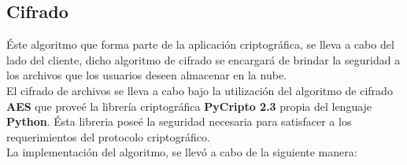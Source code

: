 \subsection{Cifrado}
Éste algoritmo que forma parte de la aplicación criptográfica, se lleva a cabo del lado del cliente, dicho algoritmo de cifrado se encargará de brindar la seguridad a los archivos que los usuarios deseen almacenar en la nube. \\
El cifrado de archivos se lleva a cabo bajo la utilización del algoritmo de cifrado \textbf{AES} que proveé la librería criptográfica \textbf{PyCripto 2.3} propia del lenguaje \textbf{Python}. Ésta libreria poseé la seguridad necesaria para satisfacer a los requerimientos del protocolo criptográfico.  \\ 
La implementación del algoritmo, se llevó a cabo de la siguiente manera: 

